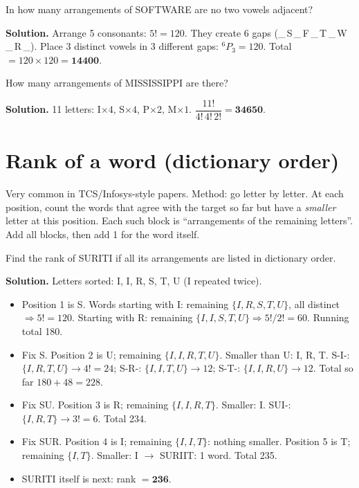 \documentclass[11pt,a4paper,openany]{report}
\begin{document}
\begin{example}
In how many arrangements of SOFTWARE are no two vowels adjacent?

\textbf{Solution.} Arrange 5 consonants: $5!=120$. They create 6 gaps
(\_\,S\,\_\,F\,\_\,T\,\_\,W\,\_\,R\,\_). Place 3 distinct vowels in 3 different gaps:
$^6P_3=120$. Total $=120\times120=\mathbf{14400}$.
\end{example}

\begin{example}
How many arrangements of MISSISSIPPI are there?

\textbf{Solution.} 11 letters: I$\times4$, S$\times4$, P$\times2$, M$\times1$.
$\dfrac{11!}{4!\,4!\,2!}=\mathbf{34650}$.
\end{example}

\section{Rank of a word (dictionary order)}
Very common in TCS/Infosys-style papers. Method: go letter by letter. At each position, count
the words that agree with the target so far but have a \emph{smaller} letter at this position.
Each such block is ``arrangements of the remaining letters''. Add all blocks, then add 1 for the word itself.

\begin{example}
Find the rank of SURITI if all its arrangements are listed in dictionary order.

\textbf{Solution.} Letters sorted: I, I, R, S, T, U (I repeated twice).
\begin{itemize}[nosep]
\item Position 1 is S. Words starting with I: remaining $\{I,R,S,T,U\}$, all distinct $\Rightarrow5!=120$.
Starting with R: remaining $\{I,I,S,T,U\}\Rightarrow 5!/2!=60$. Running total 180.
\item Fix S. Position 2 is U; remaining $\{I,I,R,T,U\}$. Smaller than U: I, R, T.
S-I-: $\{I,R,T,U\}\to4!=24$; S-R-: $\{I,I,T,U\}\to12$; S-T-: $\{I,I,R,U\}\to12$. Total so far $180+48=228$.
\item Fix SU. Position 3 is R; remaining $\{I,I,R,T\}$. Smaller: I. SUI-: $\{I,R,T\}\to3!=6$. Total 234.
\item Fix SUR. Position 4 is I; remaining $\{I,I,T\}$: nothing smaller. Position 5 is T; remaining $\{I,T\}$. Smaller: I $\to$ SURIIT: 1 word. Total 235.
\item SURITI itself is next: rank $=\mathbf{236}$.
\end{itemize}
\end{example}
\end{document}
